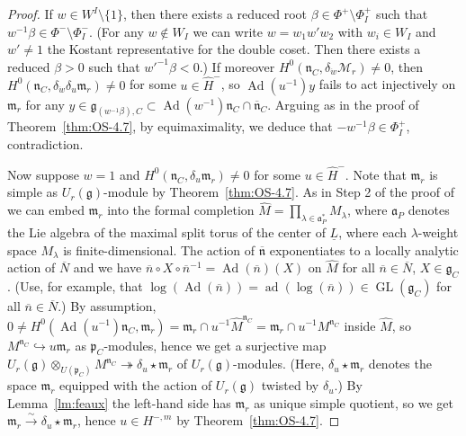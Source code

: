\documentclass[a4paper]{amsart}
\numberwithin{equation}{section}
\theoremstyle{remark}
\theoremstyle{definition}
\DeclareMathOperator{\Ad}{Ad}
\DeclareMathOperator{\ad}{ad}
\DeclareMathOperator{\GL}{GL}
\newcommand{\alggrp}[1]{\underline{#1}}
\newcommand{\congto}{\xrightarrow{\,\sim\,}}
\newcommand{\into}{\hookrightarrow}
\newcommand{\onto}{\twoheadrightarrow}
\renewcommand{\o}[1]{\overline{#1}}
\begin{document}
\begin{proof}
  If $w \in W^I \setminus \{1\}$, then there exists a reduced root $\beta \in \Phi^+ \setminus \Phi^+_I$ such that $w^{-1}\beta \in \Phi^- \setminus \Phi^-_I$.
  (For any $w \not\in W_I$ we can write $w = w_1 w' w_2$ with $w_i \in W_I$ and $w' \ne 1$ the Kostant representative for the double coset. Then there exists a reduced $\beta > 0$ such that $w'^{-1}\beta < 0$.) 
  If moreover $H^0(\mathfrak{n}_C, \delta_{\dot w}\mathcal{M}_{r}) \ne 0$, then $H^0(\mathfrak{n}_C, \delta_{\dot w}\delta_u \mathfrak{m}_{r}) \ne 0$ for some $u \in \hat H^-$,
  so $\Ad(u^{-1})y$ fails to act injectively on $\mathfrak{m}_{r}$ for any $y \in \mathfrak{g}_{(w^{-1}\beta),C} \subset \Ad(w^{-1})\mathfrak{n}_C \cap \o{\mathfrak{n}}_C$.
  Arguing as in the proof of Theorem~\ref{thm:OS-4.7}, by equimaximality, we deduce that $-w^{-1}\beta \in \Phi^+_I$, contradiction.

  Now suppose $w = 1$ and $H^0(\mathfrak{n}_C, \delta_u \mathfrak{m}_{r}) \ne 0$ for some $u \in \hat H^-$. 
  Note that $\mathfrak{m}_{r}$ is simple as $U_{r}(\mathfrak{g})$-module by Theorem~\ref{thm:OS-4.7}.
  As in Step 2 of the proof of \cite[Theorem 4.7]{OS3} we can embed $\mathfrak{m}_{r}$ into the formal completion $\widehat{M} = \prod_{\lambda \in \mathfrak{a}_P^*} M_\lambda$,
  where $\mathfrak{a}_P$ denotes the Lie algebra of the maximal split torus of the center of $\alggrp L$, where each $\lambda$-weight space $M_\lambda$ is finite-dimensional.
  The action of $\o{\mathfrak{n}}$ exponentiates to a locally analytic action of $\o N$ and we have $\o n \circ X \circ {\o n}^{-1} = \Ad(\o n)(X)$ on $\widehat M$
  for all $\o n \in \o N$, $X \in \mathfrak{g}_C$. 
  (Use, for example, that $\log(\Ad(\o n)) = \ad(\log(\o n)) \in \GL(\mathfrak{g}_C)$ for all $\o n \in \o N$.)
  By assumption, $0 \ne H^0(\Ad(u^{-1})\mathfrak{n}_C, \mathfrak{m}_{r}) = \mathfrak{m}_{r} \cap u^{-1} \widehat{M}^{\mathfrak{n}_C} = \mathfrak{m}_{r} \cap u^{-1} M^{\mathfrak{n}_C}$ inside $\widehat{M}$, so $M^{\mathfrak{n}_C} \into u\mathfrak{m}_{r}$ as $\mathfrak{p}_C$-modules,
  hence we get a surjective map $U_{r}(\mathfrak{g}) \otimes_{U(\mathfrak{p}_{C})} M^{\mathfrak{n}_C} \onto \delta_u \star\mathfrak{m}_{r}$ of $U_{r}(\mathfrak{g})$-modules.
  (Here, $\delta_u \star\mathfrak{m}_{r}$ denotes the space $\mathfrak{m}_{r}$ equipped with the action of $U_{r}(\mathfrak{g})$ twisted by $\delta_{u}$.)
  By Lemma~\ref{lm:feaux} the left-hand side has $\mathfrak{m}_{r}$ as unique simple quotient, so we get $\mathfrak{m}_{r} \congto \delta_u \star\mathfrak{m}_{r}$,
  hence $u \in H^{-,m}$ by Theorem~\ref{thm:OS-4.7}.


\end{proof}
\end{document}

